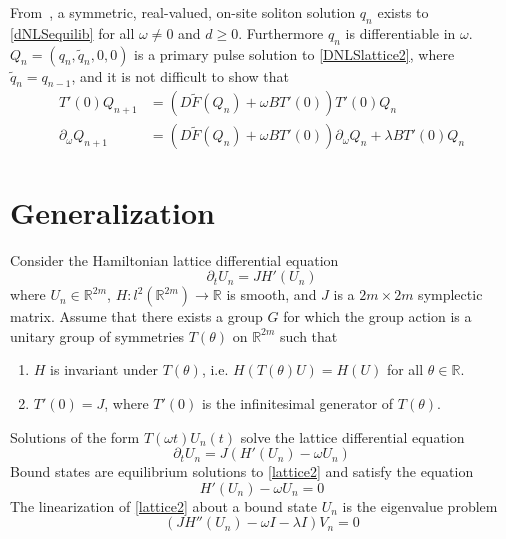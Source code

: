 \documentclass[12pt]{article}
\def\R{{\mathbb R}}
\begin{document}
From~\cite{herrmann_2011}, a symmetric, real-valued, on-site soliton solution $q_n$ exists to \eqref{dNLSequilib} for all $\omega \neq 0$ and $d \geq 0$. Furthermore $q_n$ is differentiable in $\omega$. $Q_n = (q_n, \tilde{q}_n, 0, 0)$ is a primary pulse solution to \eqref{DNLSlattice2}, where $\tilde{q}_n = q_{n-1}$, and it is not difficult to show that
\begin{align}
T'(0) Q_{n+1} &= (D\tilde{F}(Q_n) + \omega B T'(0)) T'(0) Q_n \label{dNLSkernel} \\
\partial_\omega Q_{n+1} &= (D\tilde{F}(Q_n) + \omega B T'(0)) \partial_\omega Q_n + \lambda B T'(0) Q_n \label{dNLSgenkernel}
\end{align}

\section{Generalization}

Consider the Hamiltonian lattice differential equation 
\begin{equation}\label{lattice1}
\partial_t U_n = J H'(U_n)
\end{equation}
where $U_n \in \R^{2m}$, $H: l^2(\R^{2m}) \rightarrow \R$ is smooth, and $J$ is a $2m \times 2m$ symplectic matrix. Assume that there exists a group $G$ for which the group action is a unitary group of symmetries $T(\theta)$ on $\R^{2m}$ such that 
    \begin{enumerate}
        \item $H$ is invariant under $T(\theta)$, i.e. $H(T(\theta)U) = H(U)$ for all $\theta \in \R$.
        \item $T'(0) = J$, where $T'(0)$ is the infinitesimal generator of $T(\theta)$.
    \end{enumerate}
Solutions of the form $T(\omega t)U_n(t)$ solve the lattice differential equation
\begin{equation}\label{lattice2}
\partial_t U_n = J (H'(U_n) - \omega U_n)
\end{equation} 
Bound states are equilibrium solutions to \eqref{lattice2} and satisfy the equation
\begin{equation}\label{latticestat}
H'(U_n) - \omega U_n = 0
\end{equation}
The linearization of \eqref{lattice2} about a bound state $U_n$ is the eigenvalue problem
\begin{equation}\label{latticeEVP}
(J H''(U_n) - \omega I - \lambda I) V_n = 0
\end{equation}
\end{document}
